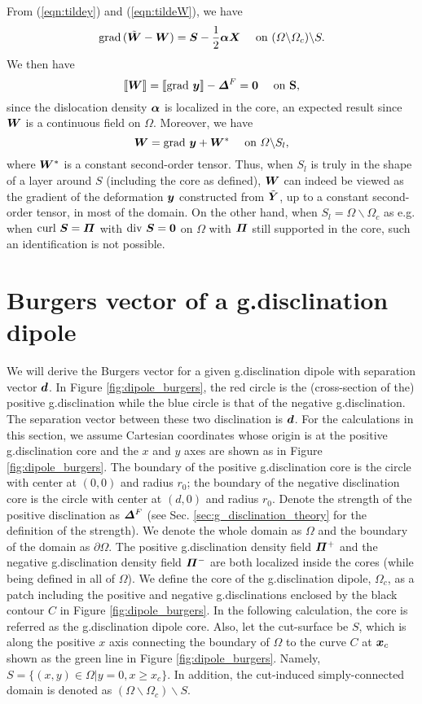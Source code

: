\documentclass[11pt,letterpaper]{article}
\begin{document}
From (\ref{eqn:tildey}) and (\ref{eqn:tildeW}), we have
\[
\grad \, (\tilde{\bfW} - \bfW) = \bfS - \frac{1}{2} \bfalpha \bfX \ \ \ \ \mbox{on} \ (\Omega \backslash \Omega_c) \backslash S.
\]
We then have
\begin{equation*}
\llbracket \bfW \rrbracket = \llbracket \grad \, \bfy \rrbracket - \bfDelta^F = \bf0 \ \ \ \ \mbox{on} \   S,
\end{equation*}
since the dislocation density $\bfalpha$ is localized in the core, an expected result since $\bfW$ is a continuous field on $\Omega$. Moreover, we have
\[
\bfW = \grad\, \bfy + \bfW^* \ \ \ \ \mbox{on} \ \Omega \backslash S_l,
\]
where $\bfW^*$ is a constant second-order tensor. Thus, when $S_l$ is truly in the shape of a layer around $S$ (including the core as defined), $\bfW$ can indeed be viewed as the gradient of the deformation $\bfy$ constructed from $\tilde{\bfY}$, up to a constant second-order tensor, in most of the domain. On the other hand, when $S_l = \Omega \backslash \Omega_c$ as e.g. when $\curl \, \bfS = \bfPi$ with $\divergence\, \bfS = \bf0$ on $\Omega$ with $\bfPi$ still supported in the core, such an identification is not possible.

 \section{Burgers vector of a g.disclination dipole} \label{sec:burgers}

We will derive the Burgers vector for a given g.disclination dipole with separation vector $\bfd$. In Figure \ref{fig:dipole_burgers}, the red circle is the (cross-section of the) positive g.disclination while the blue circle is that of the  negative g.disclination. The separation vector between these two disclination is $\bfd$.  For the calculations in this section, we assume Cartesian coordinates whose origin is at the positive g.disclination core and the $x$ and $y$ axes are shown as in Figure \ref{fig:dipole_burgers}. The boundary of the positive g.disclination core is the circle with center at $(0,0)$ and radius $r_0$; the boundary of the negative disclination core is the circle with center at $(d,0)$ and radius $r_0$.  Denote the strength of the positive disclination as $\bfDelta^F$ (see Sec. \ref{sec:g_disclination_theory} for the definition of the strength). We denote the whole domain as $\Omega$ and the boundary of the domain as $\partial \Omega$. The positive g.disclination density field $\bfPi^+$ and the negative g.disclination density field $\bfPi^-$ are both localized inside the cores (while being defined in all of $\Omega$).  We define the core of the g.disclination dipole, $\Omega_c$, as a patch including the positive and negative g.disclinations enclosed by the black contour $C$ in Figure \ref{fig:dipole_burgers}. In the following calculation, the core is referred as the g.disclination dipole core. Also, let the cut-surface be $S$, which is along the positive $x$ axis connecting the boundary of $\Omega$ to the curve $C$ at $\bfx_c$ shown as the green line in Figure \ref{fig:dipole_burgers}. Namely, $S=\{(x,y) \in \Omega | y=0, x \ge x_c\}$. In addition, the cut-induced simply-connected domain is denoted as $(\Omega \backslash \Omega_c)\backslash S$. 
\end{document}
